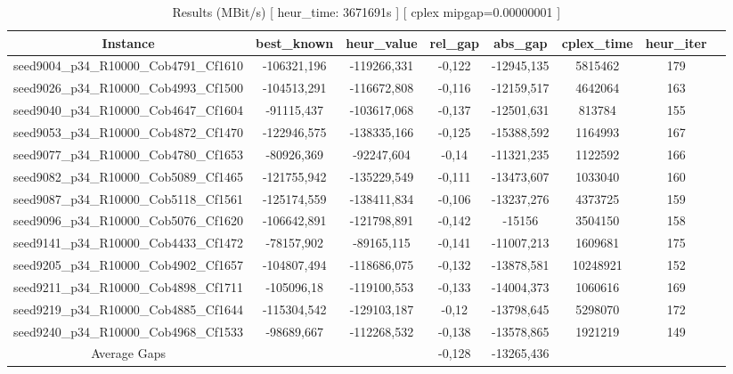 \documentclass[a4paper]{article}
\begin{document}
\begin{center}
\begin{longtable}{cccccccc}
\caption{Results (MBit/s) [ heur\_time: 3671691s ]  [ cplex mipgap=0.00000001 ]}
\tabularnewline
\hline
Instance & best\_known & heur\_value & rel\_gap & abs\_gap & cplex\_time & heur\_iter\\
\hline
seed9004\_p34\_R10000\_Cob4791\_Cf1610 & -106321,196 & -119266,331 & -0,122 & -12945,135 & 5815462 & 179\\
\hline
seed9026\_p34\_R10000\_Cob4993\_Cf1500 & -104513,291 & -116672,808 & -0,116 & -12159,517 & 4642064 & 163\\
\hline
seed9040\_p34\_R10000\_Cob4647\_Cf1604 & -91115,437 & -103617,068 & -0,137 & -12501,631 & 813784 & 155\\
\hline
seed9053\_p34\_R10000\_Cob4872\_Cf1470 & -122946,575 & -138335,166 & -0,125 & -15388,592 & 1164993 & 167\\
\hline
seed9077\_p34\_R10000\_Cob4780\_Cf1653 & -80926,369 & -92247,604 & -0,14 & -11321,235 & 1122592 & 166\\
\hline
seed9082\_p34\_R10000\_Cob5089\_Cf1465 & -121755,942 & -135229,549 & -0,111 & -13473,607 & 1033040 & 160\\
\hline
seed9087\_p34\_R10000\_Cob5118\_Cf1561 & -125174,559 & -138411,834 & -0,106 & -13237,276 & 4373725 & 159\\
\hline
seed9096\_p34\_R10000\_Cob5076\_Cf1620 & -106642,891 & -121798,891 & -0,142 & -15156 & 3504150 & 158\\
\hline
seed9141\_p34\_R10000\_Cob4433\_Cf1472 & -78157,902 & -89165,115 & -0,141 & -11007,213 & 1609681 & 175\\
\hline
seed9205\_p34\_R10000\_Cob4902\_Cf1657 & -104807,494 & -118686,075 & -0,132 & -13878,581 & 10248921 & 152\\
\hline
seed9211\_p34\_R10000\_Cob4898\_Cf1711 & -105096,18 & -119100,553 & -0,133 & -14004,373 & 1060616 & 169\\
\hline
seed9219\_p34\_R10000\_Cob4885\_Cf1644 & -115304,542 & -129103,187 & -0,12 & -13798,645 & 5298070 & 172\\
\hline
seed9240\_p34\_R10000\_Cob4968\_Cf1533 & -98689,667 & -112268,532 & -0,138 & -13578,865 & 1921219 & 149\\
\hline
\hline
Average Gaps & & & -0,128 & -13265,436 & & \\
\hline
\hline
\end{longtable}
\end{center}
\end{document}
